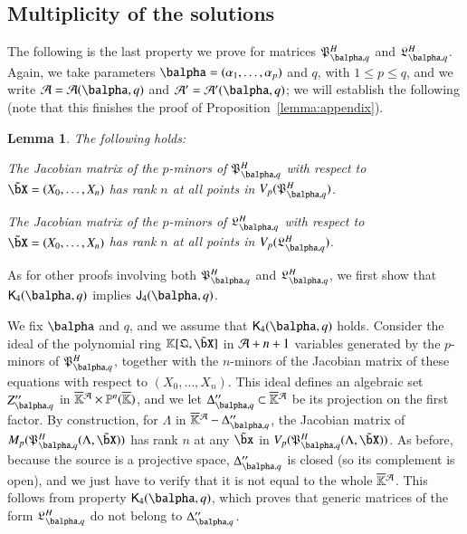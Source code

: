 \documentclass[amsthm]{elsart}
\newtheorem{lemma}[definition]{Lemma}
\begin{document}
\subsection{Multiplicity of the solutions} 
The following is the last property we prove for matrices 
$\mathfrak{P}^H_{\balpha,q}$ and $\mathfrak{L}^H_{\balpha,q}$.
Again, we take parameters $\balpha=(\alpha_1,\dots,\alpha_p)$ and $q$,
with $1 \le p \le q$, and we write ${\cal A}={\cal A}(\balpha,q)$ and
${\cal A}'={\cal A}'(\balpha,q)$; we will establish the following
(note that this finishes the proof of Proposition~\ref{lemma:appendix}).
\begin{lemma}The following holds:
\begin{description}[leftmargin=*]
\item[$\assI_4(\balpha,q).$] The Jacobian matrix of
  the $p$-minors of $\mathfrak{P}^H_{\balpha,q}$ with respect to
  $\tilde\bX=(X_0,\dots,X_n)$ has rank $n$ at all points in
  $V_p(\mathfrak{P}^H_{\balpha,q})$.
\item[$\assJ_4(\balpha,q).$] The Jacobian matrix of
  the $p$-minors of $\mathfrak{L}^H_{\balpha,q}$ with respect to
  $\tilde\bX=(X_0,\dots,X_n)$ has rank $n$ at all points in
  $V_p(\mathfrak{L}^H_{\balpha,q})$.
\end{description}
\end{lemma}
As for other proofs involving both $\mathfrak{P}^H_{\balpha,q}$ and
$\mathfrak{L}^H_{\balpha,q}$, we first show that $\assJ_4(\balpha,q)$
implies $\assI_4(\balpha,q)$.

We fix $\balpha$ and $q$, and we assume that $\assJ_4(\balpha,q)$
holds. Consider the ideal of the polynomial ring
$\KK[\mathfrak{Q},\tilde\bX]$ in ${\cal A}+n+1$ variables generated by the
$p$-minors of $\mathfrak{P}^H_{\balpha,q}$, together with the
$n$-minors of the Jacobian matrix of these equations with respect to
$(X_0,\dots,X_n)$. This ideal defines an algebraic set
$Z''_{\balpha,q}$ in $\KKbar{}^{\cal A} \times \P^n(\KKbar)$, and we let
$\Delta''_{\balpha,q} \subset \KKbar{}^{\cal A}$ be its projection on the
first factor. By construction, for $\Lambda$ in
$\KKbar{}^{\cal A}-\Delta''_{\balpha,q}$, the Jacobian matrix of
$M_p(\mathfrak{P}^H_{\balpha,q}(\Lambda,\tilde\bX))$ has rank $n$ at
any $\tilde\bx$ in
$V_p(\mathfrak{P}^H_{\balpha,q}(\Lambda,\tilde\bX))$. As before,
because the source is a projective space, $\Delta''_{\balpha,q}$ is closed
(so its complement is open), and we just have to verify that it is not
equal to the whole $\KKbar{}^{\cal A}$. This follows from property
$\assJ_4(\balpha,q)$, which proves that generic matrices of the form
$\mathfrak{L}^H_{\balpha,q}$ do not belong to $\Delta''_{\balpha,q}$.
\end{document}
